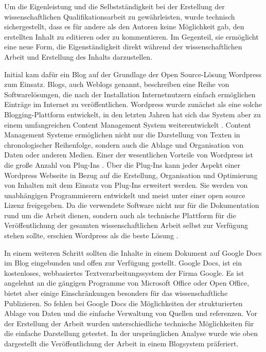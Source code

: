 Um die Eigenleistung und die Selbstständigkeit bei der Erstellung der wissenschaftlichen Qualifikationsarbeit zu gewährleisten, wurde technisch sichergestellt, dass es für andere als den Autoren keine Möglichkeit gab, den erstellten Inhalt zu editieren oder zu kommentieren. Im Gegenteil, sie ermöglicht eine neue Form, die Eigenständigkeit direkt während der wissenschaftlichen Arbeit und Erstellung des Inhalts darzustellen.

Initial kam dafür ein Blog auf der Grundlage der Open Source-Lösung Wordpress zum Einsatz. Blogs, auch Weblogs genannt, beschreiben eine Reihe von Softwarelösungen, die nach der Installation Internetnutzern einfach ermöglichen Einträge im Internet zu veröffentlichen. Wordpress wurde zunächst als eine solche Blogging-Plattform entwickelt, in den letzten Jahren hat sich das System aber zu einem umfangreichen Content Management System weiterentwickelt \cite{Patel_2011_cms}. Content Management Systeme ermöglichen nicht nur die Darstellung von Texten in chronologischer Reihenfolge, sondern auch die Ablage und Organisation von Daten oder anderen Medien. Einer der wesentlichen Vorteile von Wordpress ist die große Anzahl von Plug-Ins \cite{Patel_2011_cms}. Über die Plug-Ins kann jeder Aspekt einer Wordpress Webseite in Bezug auf die Erstellung, Organisation und Optimierung von Inhalten mit dem Einsatz von Plug-Ins erweitert werden. Sie werden von unabhängigen Programmierern entwickelt und meist unter einer open source Lizenz freigegeben. Da die verwendete Software nicht nur für die Dokumentation rund um die Arbeit dienen, sondern auch als technische Plattform für die Veröffentlichung der gesamten wissenschaftlichen Arbeit selbst zur Verfügung stehen sollte, erschien Wordpress als die beste Lösung \cite{Jones_2013_CMS}.

In einem weiteren Schritt sollten die Inhalte in einem Dokument auf Google Docs im Blog eingebunden und offen zur Verfügung gestellt. Google Docs, ist ein kostenloses, webbasiertes Textverarbeitungssystem der Firma Google. Es ist angelehnt an die gängigen Programme von Microsoft Office oder Open Office, bietet aber einige Einschränkungen besonders für das wissenschaftliche Publizieren. So fehlen bei Google Docs die Möglichkeiten der strukturierten Ablage von Daten und die einfache Verwaltung von Quellen und referenzen. Vor der Erstellung der Arbeit wurden unterschiedliche technische Möglichkeiten für die einfache Darstellung getestet. In der ursprünglichen Analyse wurde wie oben dargestellt die Veröffentlichung der Arbeit in einem Blogsystem präferiert.

